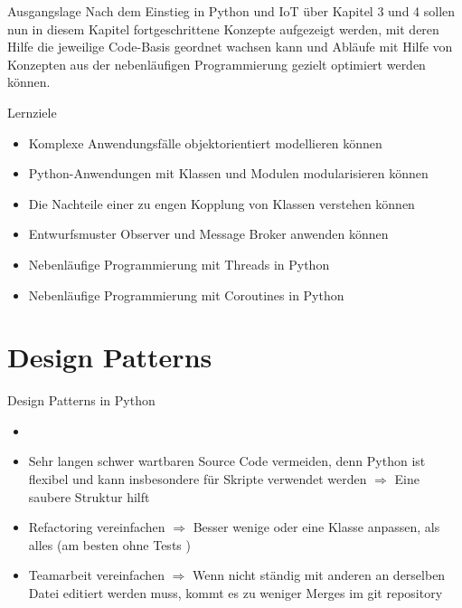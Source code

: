 \begin{frame}{Ausgangslage}
    Nach dem Einstieg in Python und IoT über Kapitel 3 und 4 sollen nun in diesem Kapitel fortgeschrittene Konzepte aufgezeigt werden, mit deren Hilfe die jeweilige Code-Basis geordnet wachsen kann und Abläufe mit Hilfe von Konzepten aus der nebenläufigen Programmierung gezielt optimiert werden können.
    
    \end{frame}

\begin{frame}{Lernziele}
    \begin{itemize}
        \item Komplexe Anwendungsfälle objektorientiert modellieren können
        \item Python-Anwendungen mit Klassen und Modulen modularisieren können
        \item Die Nachteile einer zu engen Kopplung von Klassen verstehen können
        \item Entwurfsmuster Observer und Message Broker anwenden können
        \item Nebenläufige Programmierung mit Threads in Python
        \item Nebenläufige Programmierung mit Coroutines in Python
    \end{itemize}
\end{frame}


\section{Design Patterns}

\begin{frame}{Design Patterns in Python}
    \begin{itemize}
        \setlength{\itemindent}{2.25in}
        \item [\textbf{Motivation: Design Patterns in Python}]
    \end{itemize}

    \begin{itemize}
        \item Sehr langen schwer wartbaren Source Code vermeiden, denn Python ist flexibel und kann insbesondere für Skripte verwendet werden  $\Rightarrow$  Eine saubere Struktur hilft
        \item Refactoring vereinfachen  $\Rightarrow$  Besser wenige oder eine Klasse anpassen, als alles (am besten ohne Tests \smiley{} )
        \item Teamarbeit vereinfachen  $\Rightarrow$  Wenn  nicht ständig mit anderen an derselben Datei editiert werden muss, kommt es zu weniger Merges im git repository
   \end{itemize}

  \end{frame}


